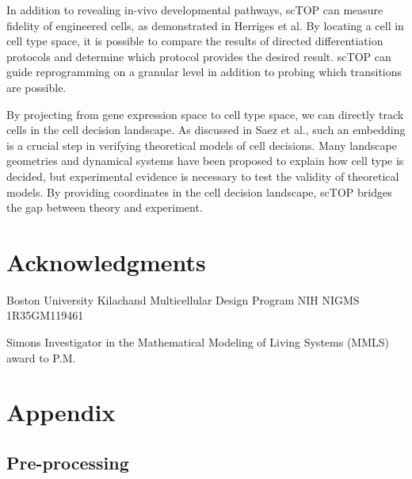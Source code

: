 \documentclass[aps,superscriptaddress, notitlepage,longbibliography]{revtex4-1}
\newcommand{\beginsupplement}{%
        \setcounter{table}{0}
        \renewcommand{\thetable}{S\arabic{table}}%
        \setcounter{figure}{0}
        \renewcommand{\thefigure}{S\arabic{figure}}%
     }
\begin{document}
In addition to revealing in-vivo developmental pathways, scTOP can measure fidelity of engineered cells, as demonstrated in Herriges et al. By locating a cell in cell type space, it is possible to compare the results of directed differentiation protocols and determine which protocol provides the desired result. scTOP can guide reprogramming on a granular level in addition to probing which transitions are possible.

By projecting from gene expression space to cell type space, we can directly track cells in the cell decision landscape. As discussed in Saez et al.\cite{saez_dynamical_nodate}, such an embedding is a crucial step in verifying theoretical models of cell decisions. Many landscape geometries and dynamical systems have been proposed to explain how cell type is decided, but experimental evidence is necessary to test the validity of theoretical models. By providing coordinates in the cell decision landscape, scTOP bridges the gap between theory and experiment.

\section*{Acknowledgments}

Boston University Kilachand Multicellular Design Program NIH NIGMS 1R35GM119461

Simons Investigator in the Mathematical Modeling of Living Systems (MMLS) award to P.M.

\section*{Appendix}
\beginsupplement
\subsection{Pre-processing} \label{preprocessing}
\end{document}
